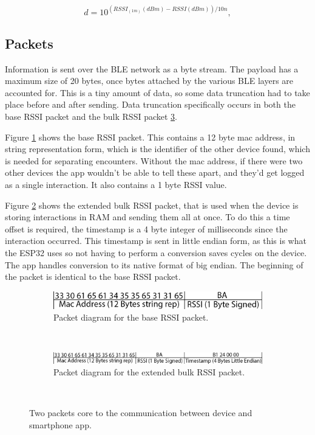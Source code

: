 \documentclass{l4proj}
\begin{document}
\begin{equation}
    {d}=10^{{({{RSSI}_{(1m)}{(dBm)}} - {RSSI(dBm)})} / {10n}},
    \label{eq:rssi-to-distance}
\end{equation}

\subsection{Packets}

Information is sent over the BLE network as a byte stream. The payload has a maximum size of 20 bytes, once bytes attached by the various BLE layers are accounted for. This is a tiny amount of data, so some data truncation had to take place before and after sending. Data truncation specifically occurs in both the base RSSI packet and the bulk RSSI packet \ref{fig:main_packets}.

Figure \ref{fig:rssi_packet} shows the base RSSI packet. This contains a 12 byte mac address, in string representation form, which is the identifier of the other device found, which is needed for separating encounters. Without the mac address, if there were two other devices the app wouldn't be able to tell these apart, and they'd get logged as a single interaction. It also contains a 1 byte RSSI value.

Figure \ref{fig:bulk_packet} shows the extended bulk RSSI packet, that is used when the device is storing interactions in RAM and sending them all at once. To do this a time offset is required, the timestamp is a 4 byte integer of milliseconds since the interaction occurred. This timestamp is sent in little endian form, as this is what the ESP32 uses so not having to perform a conversion saves cycles on the device. The app handles conversion to its native format of big endian. The beginning of the packet is identical to the base RSSI packet.

\begin{figure}[!htb]
    \centering
    \begin{subfigure}[b]{0.8\textwidth}
        \includegraphics[width=\textwidth]{images/rssi_packet.png}
        \caption{Packet diagram for the base RSSI packet.}
        \label{fig:rssi_packet}
    \end{subfigure}
    ~
    \begin{subfigure}[b]{1.0\textwidth}
        \includegraphics[width=\textwidth]{images/bulk_packet.png}
        \caption{Packet diagram for the extended bulk RSSI packet.}
        \label{fig:bulk_packet}
    \end{subfigure}
    ~
    \caption{ Two packets core to the communication between device and smartphone app. }
    \label{fig:main_packets}
\end{figure}
\end{document}
